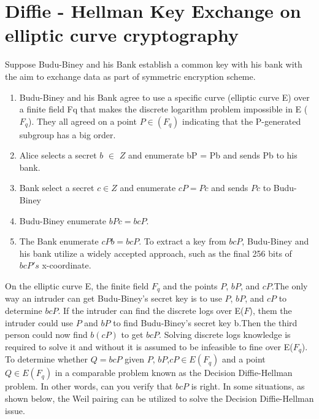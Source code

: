 \section{Diffie - Hellman Key Exchange on elliptic curve cryptography}
Suppose Budu-Biney and his Bank establish a common key with his bank with the aim to exchange data as part of symmetric encryption scheme.\\
\begin{enumerate}
\item Budu-Biney and his Bank agree to use a specific curve (elliptic curve E) over a finite field Fq  that makes the discrete logarithm problem impossible in E ($F_{q}$). They all agreed on a point $P\in(F_{q})$ indicating that the P-generated subgroup has a big order.
\item Alice selects a secret  $b$ $\in$ $Z$ and enumerate bP = Pb and sends Pb to  his bank.
\item Bank select a secret $c \in Z$ and enumerate $cP = Pc$ and sends $Pc$ to Budu-Biney
\item Budu-Biney enumerate $bPc = bcP$.
\item The Bank enumerate $cPb = bcP$.
To extract a key from $bcP$, Budu-Biney and his bank utilize a widely accepted approach, such as the final 256 bits of $bcP's$ x-coordinate.	
\end{enumerate}
On the elliptic curve E, the finite field $F_{q}$ and the points $P$, $bP$, and $cP$.The only way an intruder can get Budu-Biney's  secret key is to use $P$, $bP$, and $cP$ to determine $bcP$. If the intruder can find the discrete logs over E($F$), them the intruder could use $P$ and $bP$ to find Budu-Biney's secret key b.Then the third person could now find $b(cP)$ to get $bcP$. Solving discrete logs knowledge is required to solve it and without it is assumed to be infeasible to fine over E($F_{q}$).\\
To determine whether $Q = bcP$ given $P$, $bP$,$cP \in E(F_{q})$ and a point $Q \in E(F_{q})$ in a comparable problem known as the Decision Diffie-Hellman problem. In other words, can you verify that $bcP$ is right. In some situations, as shown below, the Weil pairing can be utilized to solve the Decision Diffie-Hellman issue.
